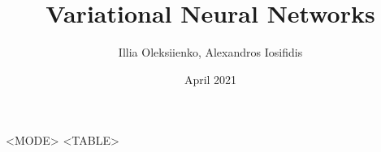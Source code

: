 \documentclass{article}
\title{Variational Neural Networks}
\author{Illia Oleksiienko, Alexandros Iosifidis}
\date{April 2021}
\begin{document}
\maketitle

\begin{center}
    \begin{longtable}[c]{<MODE>}
    \endfirsthead
    \endhead
    \hline
    \endfoot
    \hline\hline
    \endlastfoot
    <TABLE>
    \end{longtable}
\end{center}
\end{document}
